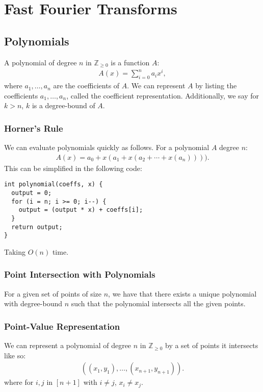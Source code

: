\section{Fast Fourier Transforms}

\subsection{Polynomials}

A polynomial of degree $n$ in $\mathbb{Z}_{\geq 0}$ is a function $A$: 
\begin{gather*}
  A(x) = \sum_{i = 0}^n a_ix^i,
\end{gather*} where $a_1, \ldots, a_n$ are the coefficients of $A$. 
We can represent $A$ by listing the coefficients $a_1, \ldots, a_n$, 
called the coefficient representation.
Additionally, we say for $k > n$, $k$ is a degree-bound of $A$.

\subsubsection{Horner's Rule}

We can evaluate polynomials quickly as follows.
For a polynomial $A$ degree $n$: \begin{gather*}
  A(x) = a_0 + x(a_1 + x(a_2 + \cdots + x(a_n)))).
\end{gather*} This can be simplified in the following code:
\begin{lstlisting}
int polynomial(coeffs, x) {
  output = 0;
  for (i = n; i >= 0; i--) {
    output = (output * x) + coeffs[i];
  }
  return output;
}
\end{lstlisting} Taking $O(n)$ time.

\subsubsection{Point Intersection with Polynomials}

For a given set of points of size $n$, we have that there exists a 
unique polynomial with degree-bound $n$ such that the polynomial
intersects all the given points.

\subsubsection{Point-Value Representation}

We can represent a polynomial of degree $n$ in $\mathbb{Z}_{\geq 0}$ 
by a set of points it intersects like so:
\begin{gather*}
  ((x_1, y_1), \ldots, (x_{n + 1}, y_{n + 1})).
\end{gather*} where for $i, j$ in $[n + 1]$ with $i \neq j$, $x_i \neq x_j$. 

